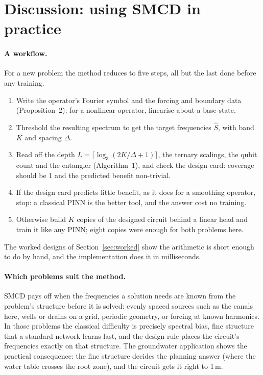 \section{Discussion: using SMCD in practice}
\label{sec:discussion}

\paragraph{A workflow.} For a new problem the method reduces to five steps, all but the
last done before any training.
\begin{enumerate}
  \item Write the operator's Fourier symbol and the forcing and boundary data
    (Proposition~2); for a nonlinear operator, linearise about a base state.
  \item Threshold the resulting spectrum to get the target frequencies $\hat S$, with
    band $K$ and spacing $\Delta$.
  \item Read off the depth $L=\lceil\log_3(2K/\Delta+1)\rceil$, the ternary scalings, the
    qubit count and the entangler (Algorithm~1), and check the design card: coverage
    should be 1 and the predicted benefit non-trivial.
  \item If the design card predicts little benefit, as it does for a smoothing operator,
    stop: a classical PINN is the better tool, and the answer cost no training.
  \item Otherwise build $K$ copies of the designed circuit behind a linear head and train
    it like any PINN; eight copies were enough for both problems here.
\end{enumerate}
The worked designs of Section~\ref{sec:worked} show the arithmetic is short enough to do
by hand, and the implementation does it in milliseconds.

\paragraph{Which problems suit the method.} SMCD pays off when the frequencies a
solution needs are known from the problem's structure before it is solved: evenly spaced
sources such as the canals here, wells or drains on a grid, periodic geometry, or forcing
at known harmonics. In those problems the classical difficulty is precisely spectral bias,
fine structure that a standard network learns last, and the design rule places the
circuit's frequencies exactly on that structure. The groundwater application shows the
practical consequence: the fine structure decides the planning answer (where the water
table crosses the root zone), and the circuit gets it right to 1\,m.

